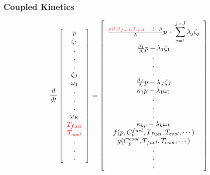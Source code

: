 \begin{frame}[fragile]
  \frametitle{Coupled Kinetics}
  \footnotesize{
\begin{equation} 
  \frac{d}{dt}\left[
    \begin{array}{c}
      p\\
      \zeta_1\\
      .\\
      .\\
      .\\
      \zeta_J\\
      \omega_1\\
      .\\
      .\\
      .\\
      \omega_K\\
      \textcolor{red}{T_{fuel}}\\
      \textcolor{red}{T_{cool}}\\
      .\\
      .\\
      .\\
    \end{array}
    \right]
    =
    \left[
      \begin{array}{ c }
        \frac{\textcolor{red}{\rho(t,T_{fuel},T_{cool},\cdots)}-\beta}{\Lambda}p + 
        \displaystyle\sum^{j=J}_{j=1}\lambda_j\zeta_j\\
        \frac{\beta_1}{\Lambda} p - \lambda_1\zeta_1\\
        .\\
        .\\
        .\\
        \frac{\beta_J}{\Lambda}p-\lambda_J\zeta_J\\
        \kappa_1p - \lambda_1\omega_1\\
        .\\
        .\\
        .\\
        \kappa_{k p} - \lambda_k\omega_{k}\\
        f(p, C_p^{fuel}, T_{fuel}, T_{cool},\cdots)\\
        g(C_p^{cool}, T_{fuel}, T_{cool},\cdots)\\
        .\\
        .\\
        .\\
      \end{array}
      \right]
      \label{eqn:ourPRKE}
    \end{equation}
  
  }
\end{frame}



